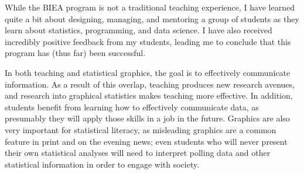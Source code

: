 \documentclass[12pt, letterpaper, sans]{moderncv}
\begin{document}
While the BIEA program is not a traditional teaching experience, I have learned quite a bit about designing, managing, and mentoring a group of students as they learn about statistics, programming, and data science. I have also received incredibly positive feedback from my students, leading me to conclude that this program has (thus far) been successful. 

In both teaching and statistical graphics, the goal is to effectively communicate information. As a result of this overlap, teaching produces new research avenues, and research into graphical statistics makes teaching more effective. In addition, students benefit from learning how to effectively communicate data, as presumably they will apply those skills in a job in the future. Graphics are also very important for statistical literacy, as misleading graphics are a common feature in print and on the evening news; even students who will never present their own statistical analyses will need to interpret polling data and other statistical information in order to engage with society. 
\end{document}
